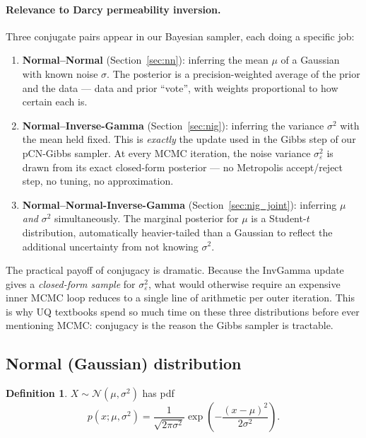 \documentclass[11pt, a4paper]{article}
\newcommand{\N}{\mathcal{N}}
\theoremstyle{definition}
\newtheorem{definition}{Definition}[section]
\begin{document}
\paragraph{Relevance to Darcy permeability inversion.}

Three conjugate pairs appear in our Bayesian sampler, each doing a specific job:

\begin{enumerate}
  \item \textbf{Normal--Normal} (Section~\ref{sec:nn}): inferring the mean
    $\mu$ of a Gaussian with known noise $\sigma$.  The posterior is a
    precision-weighted average of the prior and the data --- data and prior
    ``vote'', with weights proportional to how certain each is.

  \item \textbf{Normal--Inverse-Gamma} (Section~\ref{sec:nig}): inferring
    the variance $\sigma^2$ with the mean held fixed.  This is \emph{exactly}
    the update used in the Gibbs step of our pCN-Gibbs sampler.  At every
    MCMC iteration, the noise variance $\sigma_\varepsilon^2$ is drawn from
    its exact closed-form posterior --- no Metropolis accept/reject step,
    no tuning, no approximation.

  \item \textbf{Normal--Normal-Inverse-Gamma} (Section~\ref{sec:nig_joint}):
    inferring $\mu$ \emph{and} $\sigma^2$ simultaneously.  The marginal
    posterior for $\mu$ is a Student-$t$ distribution, automatically
    heavier-tailed than a Gaussian to reflect the additional uncertainty
    from not knowing $\sigma^2$.
\end{enumerate}

The practical payoff of conjugacy is dramatic.  Because the InvGamma
update gives a \emph{closed-form sample} for $\sigma_\varepsilon^2$,
what would otherwise require an expensive inner MCMC loop reduces to a
single line of arithmetic per outer iteration.  This is why UQ textbooks
spend so much time on these three distributions before ever mentioning MCMC:
conjugacy is the reason the Gibbs sampler is tractable.

\subsection{Normal (Gaussian) distribution}

\begin{definition}
  $X\sim\N(\mu,\sigma^2)$ has pdf
  \[
    p(x;\mu,\sigma^2) = \frac{1}{\sqrt{2\pi\sigma^2}}
    \exp\!\left(-\frac{(x-\mu)^2}{2\sigma^2}\right).
  \]
\end{definition}
\end{document}
